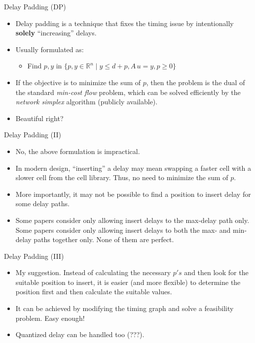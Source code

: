 \documentclass[
  ignorenonframetext,
]{beamer}
\providecommand{\tightlist}{%
  \setlength{\itemsep}{0pt}\setlength{\parskip}{0pt}}
\begin{document}
\begin{frame}{Delay Padding (DP)}
\protect\hypertarget{delay-padding-dp}{}
\begin{itemize}
\tightlist
\item
  Delay padding is a technique that fixes the timing issue by
  intentionally \textbf{solely} ``increasing'' delays.
\item
  Usually formulated as:

  \begin{itemize}
  \tightlist
  \item
    Find \(p, y\) in
    \(\{p, y \in \mathbb{R}^n \mid y \leq d + p, A\,u = y, p \geq 0\}\)
  \end{itemize}
\item
  If the objective is to minimize the sum of \(p\), then the problem is
  the dual of the standard \emph{min-cost flow} problem, which can be
  solved efficiently by the \emph{network simplex} algorithm (publicly
  available).
\item
  Beautiful right?
\end{itemize}
\end{frame}

\begin{frame}{Delay Padding (II)}
\protect\hypertarget{delay-padding-ii}{}
\begin{itemize}
\tightlist
\item
  No, the above formulation is impractical.
\item
  In modern design, ``inserting'' a delay may mean swapping a faster
  cell with a slower cell from the cell library. Thus, no need to
  minimize the sum of \(p\).
\item
  More importantly, it may not be possible to find a position to insert
  delay for some delay paths.
\item
  Some papers consider only allowing insert delays to the max-delay path
  only. Some papers consider only allowing insert delays to both the
  max- and min-delay paths together only. None of them are perfect.
\end{itemize}
\end{frame}

\begin{frame}{Delay Padding (III)}
\protect\hypertarget{delay-padding-iii}{}
\begin{itemize}
\tightlist
\item
  My suggestion. Instead of calculating the necessary \(p's\) and then
  look for the suitable position to insert, it is easier (and more
  flexible) to determine the position first and then calculate the
  suitable values.
\item
  It can be achieved by modifying the timing graph and solve a
  feasibility problem. Easy enough!
\item
  Quantized delay can be handled too (???).
\end{itemize}
\end{frame}
\end{document}
